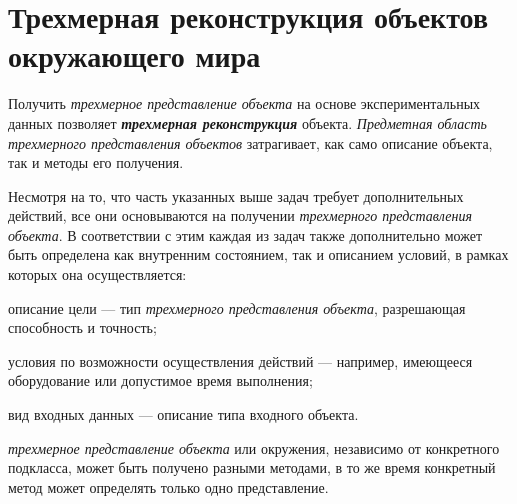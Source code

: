 \section{Трехмерная реконструкция объектов окружающего мира}
\label{sec_3d_models_reconstruction}

Получить \textit{трехмерное представление объекта} на основе экспериментальных данных позволяет \textbf{\textit{трехмерная реконструкция}} объекта. \textit{Предметная область трехмерного представления объектов} затрагивает, как само описание объекта, так и методы его получения.

\begin{SCn}
\end{SCn}

Несмотря на то, что часть указанных выше задач требует дополнительных действий, все они основываются на получении \textit{трехмерного представления объекта}. В соответствии с этим каждая из задач также дополнительно может быть определена как внутренним состоянием, так и описанием условий, в рамках которых она осуществляется:
\begin{textitemize}
    \item описание цели --- тип \textit{трехмерного представления объекта}, разрешающая способность и точность;
    \item условия по возможности осуществления действий --- например, имеющееся оборудование или допустимое время выполнения;
    \item вид входных данных --- описание типа входного объекта.
\end{textitemize}

\textit{трехмерное представление объекта} или окружения, независимо от конкретного подкласса, может быть получено разными методами, в то же время конкретный метод может определять только одно представление.

